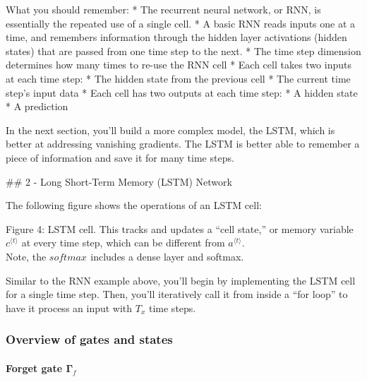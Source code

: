 \documentclass[11pt]{article}
\begin{document}
What you should remember: * The recurrent neural network, or RNN, is
essentially the repeated use of a single cell. * A basic RNN reads
inputs one at a time, and remembers information through the hidden layer
activations (hidden states) that are passed from one time step to the
next. * The time step dimension determines how many times to re-use the
RNN cell * Each cell takes two inputs at each time step: * The hidden
state from the previous cell * The current time step's input data * Each
cell has two outputs at each time step: * A hidden state * A prediction

In the next section, you'll build a more complex model, the LSTM, which
is better at addressing vanishing gradients. The LSTM is better able to
remember a piece of information and save it for many time steps.

    \#\# 2 - Long Short-Term Memory (LSTM) Network

The following figure shows the operations of an LSTM cell:

Figure 4: LSTM cell. This tracks and updates a ``cell state,'' or memory
variable \(c^{\langle t \rangle}\) at every time step, which can be
different from \(a^{\langle t \rangle}\).\\
Note, the \(softmax^{}\) includes a dense layer and softmax.

Similar to the RNN example above, you'll begin by implementing the LSTM
cell for a single time step. Then, you'll iteratively call it from
inside a ``for loop'' to have it process an input with \(T_x\) time
steps.

    \hypertarget{overview-of-gates-and-states}{%
\subsubsection{Overview of gates and
states}\label{overview-of-gates-and-states}}

\hypertarget{forget-gate-mathbfgamma_f}{%
\paragraph{\texorpdfstring{Forget gate
\(\mathbf{\Gamma}_{f}\)}{Forget gate \textbackslash mathbf\{\textbackslash Gamma\}\_\{f\}}}\label{forget-gate-mathbfgamma_f}}
\end{document}

